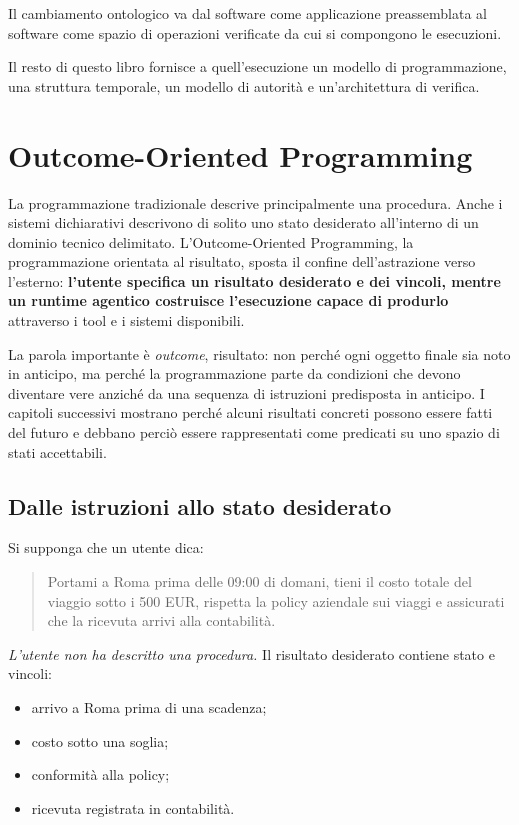 \documentclass[10pt,oneside,openany]{book}
\newcommand{\keyidea}[1]{%
  \vspace{3pt}
  \noindent\fbox{\begin{minipage}{0.94\linewidth}\small\raggedright\textbf{Idea chiave.} #1\end{minipage}}
  \vspace{3pt}
}
\renewcommand{\keyidea}[1]{\begin{keyideabox}#1\end{keyideabox}}
\begin{document}
\keyidea{Il cambiamento ontologico va dal software come applicazione preassemblata al software come spazio di operazioni verificate da cui si compongono le esecuzioni.}

Il resto di questo libro fornisce a quell'esecuzione un modello di programmazione, una struttura temporale, un modello di autorità e un'architettura di verifica.

\chapter{Outcome-Oriented Programming}

La programmazione tradizionale descrive principalmente una procedura. Anche i sistemi dichiarativi descrivono di solito uno stato desiderato all'interno di un dominio tecnico delimitato. L'Outcome-Oriented Programming, la programmazione orientata al risultato, sposta il confine dell'astrazione verso l'esterno: \textbf{l'utente specifica un risultato desiderato e dei vincoli, mentre un runtime agentico costruisce l'esecuzione capace di produrlo} attraverso i tool e i sistemi disponibili.

La parola importante è \emph{outcome}, risultato: non perché ogni oggetto finale sia noto in anticipo, ma perché la programmazione parte da condizioni che devono diventare vere anziché da una sequenza di istruzioni predisposta in anticipo. I capitoli successivi mostrano perché alcuni risultati concreti possono essere fatti del futuro e debbano perciò essere rappresentati come predicati su uno spazio di stati accettabili.

\section{Dalle istruzioni allo stato desiderato}
Si supponga che un utente dica:

\begin{quote}
Portami a Roma prima delle 09:00 di domani, tieni il costo totale del viaggio sotto i 500 EUR, rispetta la policy aziendale sui viaggi e assicurati che la ricevuta arrivi alla contabilità.
\end{quote}

\emph{L'utente non ha descritto una procedura.} Il risultato desiderato contiene stato e vincoli:

\begin{itemize}
\item arrivo a Roma prima di una scadenza;
\item costo sotto una soglia;
\item conformità alla policy;
\item ricevuta registrata in contabilità.
\end{itemize}
\end{document}
